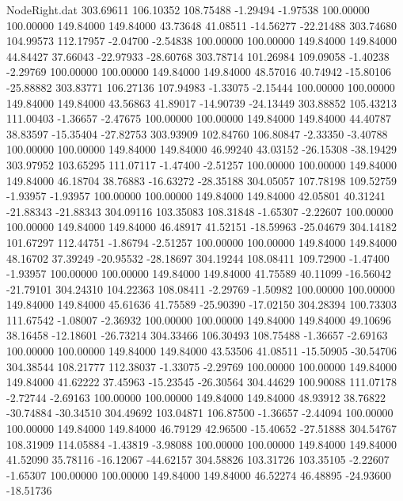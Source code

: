 \begin{filecontents}{NodeRight.dat}
 303.69611  106.10352  108.75488    -1.29494   -1.97538  100.00000  100.00000  149.84000  149.84000   43.73648   41.08511  -14.56277  -22.21488
 303.74680  104.99573  112.17957    -2.04700   -2.54838  100.00000  100.00000  149.84000  149.84000   44.84427   37.66043  -22.97933  -28.60768
 303.78714  101.26984  109.09058    -1.40238   -2.29769  100.00000  100.00000  149.84000  149.84000   48.57016   40.74942  -15.80106  -25.88882
 303.83771  106.27136  107.94983    -1.33075   -2.15444  100.00000  100.00000  149.84000  149.84000   43.56863   41.89017  -14.90739  -24.13449
 303.88852  105.43213  111.00403    -1.36657   -2.47675  100.00000  100.00000  149.84000  149.84000   44.40787   38.83597  -15.35404  -27.82753
 303.93909  102.84760  106.80847    -2.33350   -3.40788  100.00000  100.00000  149.84000  149.84000   46.99240   43.03152  -26.15308  -38.19429
 303.97952  103.65295  111.07117    -1.47400   -2.51257  100.00000  100.00000  149.84000  149.84000   46.18704   38.76883  -16.63272  -28.35188
 304.05057  107.78198  109.52759    -1.93957   -1.93957  100.00000  100.00000  149.84000  149.84000   42.05801   40.31241  -21.88343  -21.88343
 304.09116  103.35083  108.31848    -1.65307   -2.22607  100.00000  100.00000  149.84000  149.84000   46.48917   41.52151  -18.59963  -25.04679
 304.14182  101.67297  112.44751    -1.86794   -2.51257  100.00000  100.00000  149.84000  149.84000   48.16702   37.39249  -20.95532  -28.18697
 304.19244  108.08411  109.72900    -1.47400   -1.93957  100.00000  100.00000  149.84000  149.84000   41.75589   40.11099  -16.56042  -21.79101
 304.24310  104.22363  108.08411    -2.29769   -1.50982  100.00000  100.00000  149.84000  149.84000   45.61636   41.75589  -25.90390  -17.02150
 304.28394  100.73303  111.67542    -1.08007   -2.36932  100.00000  100.00000  149.84000  149.84000   49.10696   38.16458  -12.18601  -26.73214
 304.33466  106.30493  108.75488    -1.36657   -2.69163  100.00000  100.00000  149.84000  149.84000   43.53506   41.08511  -15.50905  -30.54706
 304.38544  108.21777  112.38037    -1.33075   -2.29769  100.00000  100.00000  149.84000  149.84000   41.62222   37.45963  -15.23545  -26.30564
 304.44629  100.90088  111.07178    -2.72744   -2.69163  100.00000  100.00000  149.84000  149.84000   48.93912   38.76822  -30.74884  -30.34510
 304.49692  103.04871  106.87500    -1.36657   -2.44094  100.00000  100.00000  149.84000  149.84000   46.79129   42.96500  -15.40652  -27.51888
 304.54767  108.31909  114.05884    -1.43819   -3.98088  100.00000  100.00000  149.84000  149.84000   41.52090   35.78116  -16.12067  -44.62157
 304.58826  103.31726  103.35105    -2.22607   -1.65307  100.00000  100.00000  149.84000  149.84000   46.52274   46.48895  -24.93600  -18.51736

\end{filecontents}
